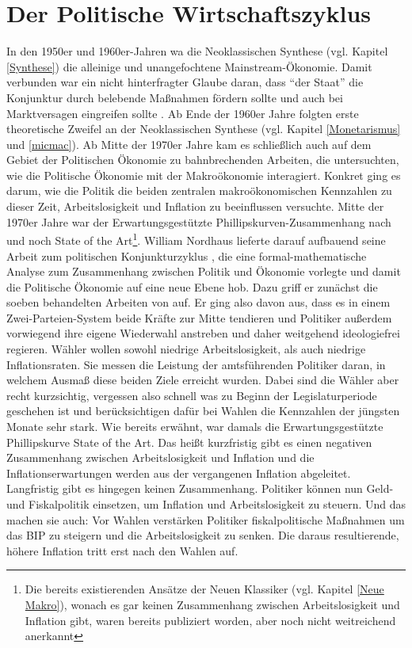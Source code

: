 \textcite[S. 110]{Mitchell1988}



\section{Der Politische Wirtschaftszyklus}
\label{Der Politische Wirtschaftszyklus}

In den 1950er und 1960er-Jahren wa die Neoklassischen Synthese (vgl. Kapitel \ref{Synthese}) die alleinige und unangefochtene Mainstream-Ökonomie. Damit verbunden war ein nicht hinterfragter Glaube daran, dass "`der Staat"' die Konjunktur durch belebende Maßnahmen fördern sollte und auch bei Marktversagen eingreifen sollte \parencite[S. 522]{Snowdon2005}. Ab Ende der 1960er Jahre folgten erste theoretische Zweifel an der Neoklassischen Synthese (vgl. Kapitel \ref{Monetarismus} und \ref{micmac}). Ab Mitte der 1970er Jahre kam es schließlich auch auf dem Gebiet der Politischen Ökonomie zu bahnbrechenden Arbeiten, die untersuchten, wie die Politische Ökonomie mit der Makroökonomie interagiert. Konkret ging es darum, wie die Politik die beiden zentralen makroökonomischen Kennzahlen zu dieser Zeit, Arbeitslosigkeit und Inflation zu beeinflussen versuchte. Mitte der 1970er Jahre war der Erwartungsgestützte Phillipskurven-Zusammenhang nach \textcite{Phelps1968} und \textcite{Friedman1968} noch State of the Art\footnote{Die bereits existierenden Ansätze der Neuen Klassiker (vgl. Kapitel \ref{Neue Makro}), wonach es gar keinen Zusammenhang zwischen Arbeitslosigkeit und Inflation gibt, waren bereits publiziert worden, aber noch nicht weitreichend anerkannt}. William Nordhaus lieferte darauf aufbauend seine Arbeit zum politischen Konjunkturzyklus \parencite{Nordhaus1975}, die eine formal-mathematische Analyse zum Zusammenhang zwischen Politik und Ökonomie vorlegte und damit die Politische Ökonomie auf eine neue Ebene hob. Dazu griff er zunächst die soeben behandelten Arbeiten von \textcite{Downs1957, Downs1957b} auf. Er ging also davon aus, dass es in einem Zwei-Parteien-System beide Kräfte zur Mitte tendieren und Politiker außerdem vorwiegend ihre eigene Wiederwahl anstreben und daher weitgehend ideologiefrei regieren. Wähler wollen sowohl niedrige Arbeitslosigkeit, als auch niedrige Inflationsraten. Sie messen die Leistung der amtsführenden Politiker daran, in welchem Ausmaß diese beiden Ziele erreicht wurden. Dabei sind die Wähler aber recht kurzsichtig, vergessen also schnell was zu Beginn der Legislaturperiode geschehen ist und berücksichtigen dafür bei Wahlen die Kennzahlen der jüngsten Monate sehr stark. Wie bereits erwähnt, war damals die Erwartungsgestützte Phillipskurve State of the Art. Das heißt kurzfristig gibt es einen negativen Zusammenhang zwischen Arbeitslosigkeit und Inflation und die Inflationserwartungen werden aus der vergangenen Inflation abgeleitet. Langfristig gibt es hingegen keinen Zusammenhang. Politiker können nun Geld- und Fiskalpolitik einsetzen, um Inflation und Arbeitslosigkeit zu steuern. Und das machen sie auch: Vor Wahlen verstärken Politiker fiskalpolitische Maßnahmen um das BIP zu steigern und die Arbeitslosigkeit zu senken. Die daraus resultierende, höhere Inflation tritt erst nach den Wahlen auf. 